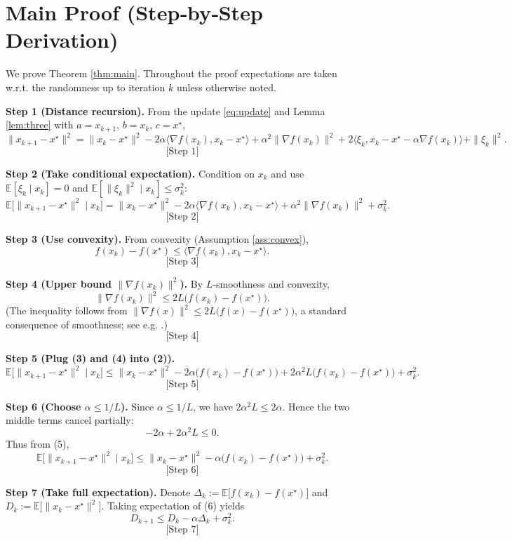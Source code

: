 \documentclass{article}
\newcommand{\E}{\mathbb{E}}
\begin{document}
\section*{Main Proof (Step‑by‑Step Derivation)}
We prove Theorem \ref{thm:main}.  Throughout the proof expectations are taken w.r.t. the randomness up to iteration $k$ unless otherwise noted.

\bigskip
\noindent\textbf{Step 1 (Distance recursion).}  
From the update \eqref{eq:update} and Lemma \ref{lem:three} with $a=x_{k+1}$, $b=x_k$, $c=x^\star$,
\[
\|x_{k+1}-x^\star\|^2
= \|x_k-x^\star\|^2-2\alpha\langle\nabla f(x_k),x_k-x^\star\rangle
+ \alpha^2\|\nabla f(x_k)\|^2
+2\langle\xi_k,x_k-x^\star-\alpha\nabla f(x_k)\rangle
+\|\xi_k\|^2.
\tag{1}
\]
\[
\text{[Step 1]}
\]

\noindent\textbf{Step 2 (Take conditional expectation).}  
Condition on $x_k$ and use $\E[\xi_k\mid x_k]=0$ and $\E[\|\xi_k\|^2\mid x_k]\le\sigma_k^2$:
\[
\E\bigl[\|x_{k+1}-x^\star\|^2\mid x_k\bigr]
= \|x_k-x^\star\|^2-2\alpha\langle\nabla f(x_k),x_k-x^\star\rangle
+ \alpha^2\|\nabla f(x_k)\|^2+\sigma_k^2.
\tag{2}
\]
\[
\text{[Step 2]}
\]

\noindent\textbf{Step 3 (Use convexity).}  
From convexity (Assumption \ref{ass:convex}),
\[
f(x_k)-f(x^\star)\le \langle\nabla f(x_k),x_k-x^\star\rangle.
\tag{3}
\]
\[
\text{[Step 3]}
\]

\noindent\textbf{Step 4 (Upper bound $\|\nabla f(x_k)\|^2$).}  
By $L$‑smoothness and convexity,
\[
\|\nabla f(x_k)\|^2\le 2L\bigl(f(x_k)-f(x^\star)\bigr).
\tag{4}
\]
(The inequality follows from $ \|\nabla f(x)\|^2\le 2L\bigl(f(x)-f(x^\star)\bigr)$, a standard consequence of smoothness; see e.g. \cite{Nesterov2004}.)
\[
\text{[Step 4]}
\]

\noindent\textbf{Step 5 (Plug (3) and (4) into (2)).}
\[
\E\bigl[\|x_{k+1}-x^\star\|^2\mid x_k\bigr]
\le \|x_k-x^\star\|^2-2\alpha\bigl(f(x_k)-f(x^\star)\bigr)
+2\alpha^2 L\bigl(f(x_k)-f(x^\star)\bigr)+\sigma_k^2.
\tag{5}
\]
\[
\text{[Step 5]}
\]

\noindent\textbf{Step 6 (Choose $\alpha\le 1/L$).}  
Since $\alpha\le 1/L$, we have $2\alpha^2 L\le 2\alpha$. Hence the two middle terms cancel partially:
\[
-2\alpha +2\alpha^2L\le 0.
\]
Thus from (5),
\[
\E\bigl[\|x_{k+1}-x^\star\|^2\mid x_k\bigr]
\le \|x_k-x^\star\|^2- \alpha\bigl(f(x_k)-f(x^\star)\bigr)+\sigma_k^2.
\tag{6}
\]
\[
\text{[Step 6]}
\]

\noindent\textbf{Step 7 (Take full expectation).}
Denote $\Delta_k:=\E\bigl[f(x_k)-f(x^\star)\bigr]$ and $D_k:=\E\bigl[\|x_k-x^\star\|^2\bigr]$.  Taking expectation of (6) yields
\[
D_{k+1}\le D_k-\alpha\Delta_k+\sigma_k^2.
\tag{7}
\]
\[
\text{[Step 7]}
\]
\end{document}
